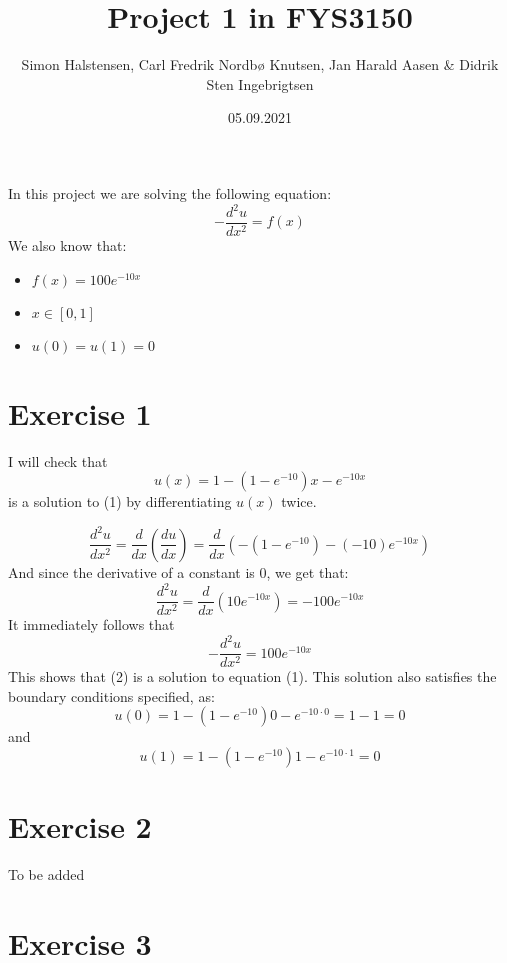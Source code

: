 \documentclass[11pt]{article} %
\title{Project 1 in FYS3150}
\author{Simon Halstensen, Carl Fredrik Nordbø Knutsen, Jan Harald Aasen \& Didrik Sten Ingebrigtsen}
\date{05.09.2021} %
\begin{document}
\maketitle
In this project we are solving the following equation:
\begin{equation} - \dfrac{d^2u}{dx^2} = f(x) \end{equation}
We also know that:
\begin{itemize}
	\item \(f(x) = 100e^{-10x}\)
	\item \(x \in [0, 1]\)
	\item \(u(0)=u(1)=0\)
\end{itemize}

\section*{Exercise 1}


I will check that 
\begin{equation}  u(x) = 1 - (1- e^{-10})x -e^{-10x} \end{equation}
is a solution to (1) by differentiating \(u(x)\) twice. 

\[\dfrac{d^2u}{dx^2} =\dfrac{d}{dx}(\dfrac{du}{dx}) = \dfrac{d}{dx}( -(1 - e^{-10}) - (-10)e^{-10x})\]
And since the derivative of a constant is 0, we get that: 
\[\dfrac{d^2u}{dx^2} = \dfrac{d}{dx}(10e^{-10x}) = -100e^{-10x}\]
It immediately follows that
\[ - \dfrac{d^2u}{dx^2} = 100e^{-10x}\]
This shows that (2) is a solution to equation (1).
This solution also satisfies the boundary conditions specified, as:
\[u(0) = 1 - (1- e^{-10})0 -e^{-10\cdot 0} = 1-1 = 0\]
and
\[u(1) = 1 - (1- e^{-10})1 -e^{-10\cdot 1} = 0\]

\section*{Exercise 2}

To be added

\section*{Exercise 3}
\end{document}
